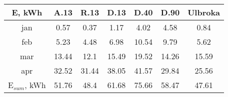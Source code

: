 \begin{tabular}{ | c | c c c c c c | }\hline
E, kWh	&A.13	&R.13	&D.13	&D.40	&D.90 &Ulbroka\\ \hline
jan	&0.57	&0.37	&1.17	&4.02	&4.58	&0.84\\
feb	&5.23	&4.48	&6.98	&10.54	&9.79	&5.62\\
mar	&13.44	&12.1	&15.49	&19.52	&14.26	&15.59\\
apr	&32.52	&31.44	&38.05	&41.57	&29.84	&25.56\\ \hline
E$_{sum}$, kWh	&51.76	&48.4	&61.68	&75.66	&58.47	&47.61\\ \hline
\end{tabular}
